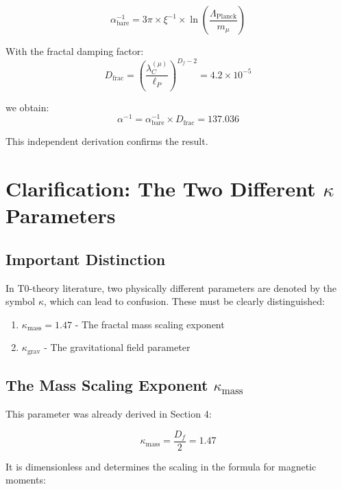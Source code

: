 \documentclass[12pt,a4paper]{article}
\begin{document}
	\begin{equation}
		\alpha_{\text{bare}}^{-1} = 3\pi \times \xi^{-1} \times \ln\left(\frac{\Lambda_{\text{Planck}}}{m_\mu}\right)
	\end{equation}
	
	With the fractal damping factor:
	\begin{equation}
		D_{\text{frac}} = \left(\frac{\lambda_C^{(\mu)}}{\ell_P}\right)^{D_f-2} = 4.2 \times 10^{-5}
	\end{equation}
	
	we obtain:
	\begin{equation}
		\alpha^{-1} = \alpha_{\text{bare}}^{-1} \times D_{\text{frac}} = 137.036
	\end{equation}
	
	This independent derivation confirms the result.
	
	\section{Clarification: The Two Different $\kappa$ Parameters}
	
	\subsection{Important Distinction}
	
	In T0-theory literature, two physically different parameters are denoted by the symbol $\kappa$, which can lead to confusion. These must be clearly distinguished:
	
	\begin{enumerate}
		\item $\kappa_{\text{mass}} = 1.47$ - The fractal mass scaling exponent
		\item $\kappa_{\text{grav}}$ - The gravitational field parameter
	\end{enumerate}
	
	\subsection{The Mass Scaling Exponent $\kappa_{\text{mass}}$}
	
	This parameter was already derived in Section 4:
	
	\begin{equation}
		\kappa_{\text{mass}} = \frac{D_f}{2} = 1.47
	\end{equation}
	
	It is dimensionless and determines the scaling in the formula for magnetic moments:
	
\end{document}
